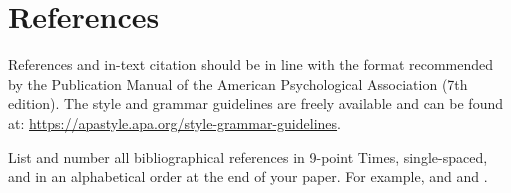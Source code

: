 \documentclass[10pt]{article}
\newcommand{\sansserifformat}[1]{\fontfamily{cmss}{ #1}}%
\begin{document}




\section{References} 

References and in-text citation should be in line with the format recommended by the Publication Manual of the American Psychological Association (7th edition). The style and grammar guidelines are freely available and can be found at:  \url{https://apastyle.apa.org/style-grammar-guidelines}.

List and number all bibliographical references in 9-point Times, single-spaced, and in an alphabetical order at the end of your paper. For example, \textcite{Castells2010, Allen1997} and \textcite{Bloomberg2018} and \textcite{Allen1997}.


% 
% 

\printbibliography
\end{document}
